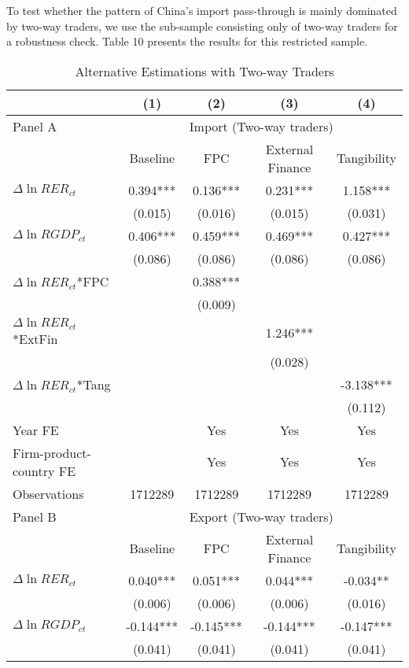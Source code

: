 To test whether the pattern of China's import pass-through is mainly dominated by two-way traders, we use the sub-sample consisting only of two-way traders for a robustness check. Table 10 presents the results for this restricted sample.

\begin{table}[htbp]
	\centering
	\caption{Alternative Estimations with Two-way Traders}
	\begin{threeparttable}
	\begin{tabular}{lcccc}
		\toprule
		& (1)   & (2)   & (3)   & (4) \\
		\midrule
		Panel A & \multicolumn{4}{c}{Import (Two-way traders)} \\
		& Baseline & FPC   & External Finance & Tangibility \\
		\midrule
		$\Delta \ln RER_{ct}$ & 0.394*** & 0.136*** & 0.231*** & 1.158*** \\
		& (0.015) & (0.016) & (0.015) & (0.031) \\
		$\Delta \ln RGDP_{ct}$ & 0.406*** & 0.459*** & 0.469*** & 0.427*** \\
		& (0.086) & (0.086) & (0.086) & (0.086) \\
		$\Delta \ln RER_{ct}$*FPC &       & 0.388*** &       &  \\
		&       & (0.009) &       &  \\
		$\Delta \ln RER_{ct}$*ExtFin &       &       & 1.246*** &  \\
		&       &       & (0.028) &  \\
		$\Delta \ln RER_{ct}$*Tang &       &       &       & -3.138*** \\
		&       &       &       & (0.112) \\
		Year FE  &       & Yes   & Yes   & Yes \\
		Firm-product-country FE &       & Yes   & Yes   & Yes \\
		Observations & 1712289 & 1712289 & 1712289 & 1712289 \\
		Panel B & \multicolumn{4}{c}{Export (Two-way traders)} \\
		& Baseline & FPC   & External Finance & Tangibility \\
		\midrule
		$\Delta \ln RER_{ct}$ & 0.040*** & 0.051*** & 0.044*** & -0.034** \\
		& (0.006) & (0.006) & (0.006) & (0.016) \\
		$\Delta \ln RGDP_{ct}$ & -0.144*** & -0.145*** & -0.144*** & -0.147*** \\
		& (0.041) & (0.041) & (0.041) & (0.041) \\

\end{tabular}
\end{threeparttable}
\end{table}
